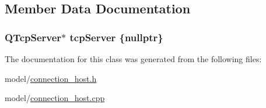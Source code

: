 \subsection{Member Data Documentation}
\subsubsection[{\texorpdfstring{tcp\+Server}{tcpServer}}]{\setlength{\rightskip}{0pt plus 5cm}Q\+Tcp\+Server$\ast$ tcp\+Server \{nullptr\}\hspace{0.3cm}{\ttfamily [private]}}\hypertarget{classMODEL_1_1ConnectionHost_a79c9047a78bc919910a66376a7c5bb4d}{}\label{classMODEL_1_1ConnectionHost_a79c9047a78bc919910a66376a7c5bb4d}


The documentation for this class was generated from the following files\+:\begin{DoxyCompactItemize}
\item 
model/\hyperlink{connection__host_8h}{connection\+\_\+host.\+h}\item 
model/\hyperlink{connection__host_8cpp}{connection\+\_\+host.\+cpp}\end{DoxyCompactItemize}
